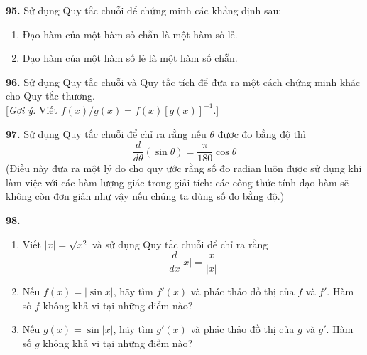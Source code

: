 \begin{minipage}[t]{0.485\textwidth}
\vspace{8pt}
\noindent
\textbf{95.} Sử dụng Quy tắc chuỗi để chứng minh các khẳng định sau:
\begin{enumerate}[label=(\alph*), leftmargin=*, itemsep=1pt, topsep=2pt]
  \item Đạo hàm của một hàm số chẵn là một hàm số lẻ.
  \item Đạo hàm của một hàm số lẻ là một hàm số chẵn.
\end{enumerate}

\vspace{8pt}
\noindent
\textbf{96.} Sử dụng Quy tắc chuỗi và Quy tắc tích để đưa ra một cách chứng minh khác cho Quy tắc thương.\\
{[\textit{Gợi ý:} Viết $f(x)/g(x) = f(x)[g(x)]^{-1}$.]}

\vspace{8pt}
\noindent
\textbf{97.} Sử dụng Quy tắc chuỗi để chỉ ra rằng nếu $\theta$ được đo bằng độ thì
\[
\frac{d}{d\theta} (\sin\theta) = \frac{\pi}{180} \cos\theta
\]
(Điều này đưa ra một lý do cho quy ước rằng số đo radian luôn được sử dụng khi làm việc với các hàm lượng giác trong giải tích: các công thức tính đạo hàm sẽ không còn đơn giản như vậy nếu chúng ta dùng số đo bằng độ.)

\vspace{8pt}
\noindent
\textbf{98.}
\begin{enumerate}[label=(\alph*), leftmargin=*, itemsep=1pt, topsep=2pt]
  \item Viết $|x| = \sqrt{x^2}$ và sử dụng Quy tắc chuỗi để chỉ ra rằng
  \[
  \frac{d}{dx} |x| = \frac{x}{|x|}
  \]
  \item Nếu $f(x) = |\sin x|$, hãy tìm $f'(x)$ và phác thảo đồ thị của $f$ và $f'$. Hàm số $f$ không khả vi tại những điểm nào?
  \item Nếu $g(x) = \sin |x|$, hãy tìm $g'(x)$ và phác thảo đồ thị của $g$ và $g'$. Hàm số $g$ không khả vi tại những điểm nào?
\end{enumerate}
\end{minipage}
